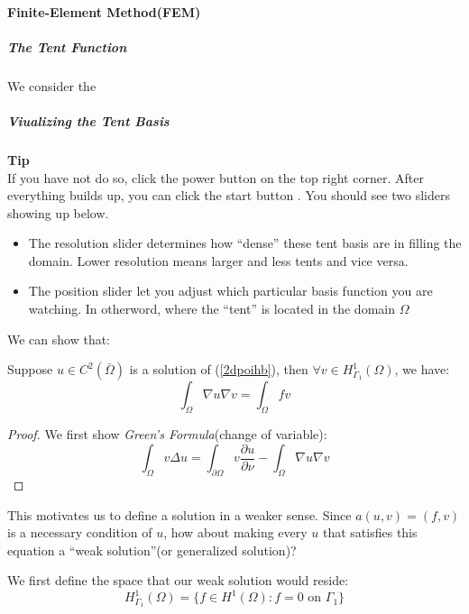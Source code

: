 \paragraph{Finite-Element Method(FEM)}

\subparagraph{The Tent Function}

We consider the

\subparagraph{Viualizing the Tent Basis}

\begin{framed}
\textbf{Tip}\\
If you have not do so, click the power button on the top right corner.
After everything builds up, you can click the start button . You should see two sliders showing up below.

\begin{itemize}
\item The resolution slider determines how ``dense'' these tent basis are in filling the domain. Lower resolution means larger and less tents and vice versa.
\item The position slider let you adjust which particular basis function you are watching. In otherword, where the ``tent'' is located in the domain $\Omega$
\end{itemize}
\end{framed}


We can show that:

\begin{proposition}Suppose $u \in C^2(\bar \Omega)$ is a solution of (\ref{2dpoihb}), then $\forall v \in H^1_{\Gamma_1}(\Omega)$, we have:
\begin{equation}
\int_{\Omega}\nabla u \nabla v=\int_{\Omega} fv
\end{equation}

\end{proposition}\begin{proof}We first show \textit{Green's Formula}(change of variable):
\begin{equation}
\int_{\Omega}v \Delta u = \int_{\partial \Omega} v \frac{\partial u}{\partial \nu} - \int_{\Omega} \nabla u \nabla v
\end{equation}

\end{proof}This motivates us to define a solution in a weaker sense. Since $a(u,v)=(f,v)$ is a necessary condition of $u$, how about making every $u$ that satisfies this equation a ``weak solution''(or generalized solution)?

We first define the space that our weak solution would reside:
\begin{equation}
H^1_{\Gamma_1}(\Omega)=\{f\in H^1(\Omega): f=0 \text{ on } \Gamma_1 \}
\end{equation}